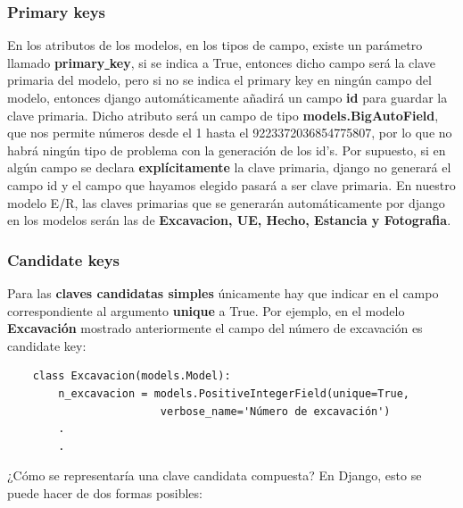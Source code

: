     \subsubsection{Primary keys}
    En los atributos de los modelos, en los tipos de campo, existe un parámetro llamado
    \textbf{primary\underline{ }key}, si se indica a True, entonces dicho campo será la clave
    primaria del modelo, pero si no se indica el primary key en ningún campo del modelo,
    entonces django automáticamente añadirá un campo \textbf{id} para guardar la clave primaria.
    Dicho atributo será un campo de tipo \textbf{models.BigAutoField}, que nos permite números
    desde el 1 hasta el 9223372036854775807, por lo que no habrá ningún tipo de problema con
    la generación de los id's. Por supuesto, si en algún campo se declara \textbf{explícitamente}
    la clave primaria, django no generará el campo id y el campo que hayamos elegido pasará a
    ser clave primaria. En nuestro modelo E/R, las claves primarias que se generarán
    automáticamente por django en los modelos serán las de \textbf{Excavacion, UE, Hecho,
    Estancia y Fotografia}. 
    
    \subsubsection{Candidate keys}
    Para las \textbf{claves candidatas simples} únicamente hay que indicar en el campo
    correspondiente al argumento \textbf{unique} a True. Por ejemplo, en el modelo
    \textbf{Excavación} mostrado anteriormente el campo del número de excavación es
    candidate key:
    
    \begin{verbatim}
    class Excavacion(models.Model):
        n_excavacion = models.PositiveIntegerField(unique=True, 
                        verbose_name='Número de excavación')
        .
        .
    \end{verbatim}

    ¿Cómo se representaría una clave candidata compuesta? En Django, esto se puede hacer de
    dos formas posibles:

